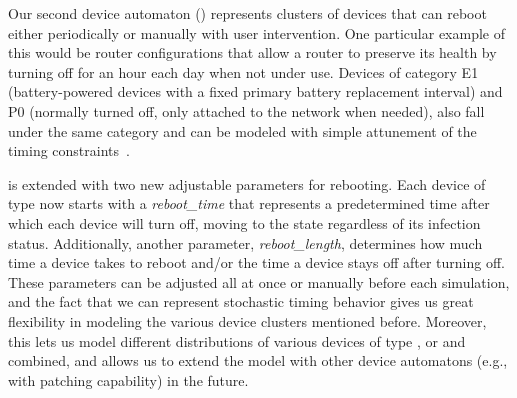 Our second device automaton (\DB) represents clusters of \RC devices that can reboot either periodically or manually with user intervention. One particular example of this would be router configurations that allow a router to preserve its health by turning off for an hour each day when not under use. Devices of category E1 (battery-powered devices with a fixed primary battery replacement interval) and P0 (normally turned off, only attached to the network when needed), also fall under the same category and can be modeled with simple attunement of the timing constraints~\cite{RFC_7228}.
\par
\DB is extended with two new adjustable parameters for rebooting. Each device of type \DB now starts with a \emph{reboot\_time} that represents a predetermined time after which each device will turn off, moving to the  state regardless of its infection status. Additionally, another parameter, \emph{reboot\_length}, determines how much time a device takes to reboot and/or the time a device stays off after turning off. These parameters can be adjusted all at once or manually before each simulation, and the fact that we can represent stochastic timing behavior gives us great flexibility in modeling the various device clusters mentioned before. Moreover, this lets us model different distributions of various devices of type \DB, or \DA and \DB combined, and allows us to extend the model with other device automatons (e.g., with patching capability) in the future.
